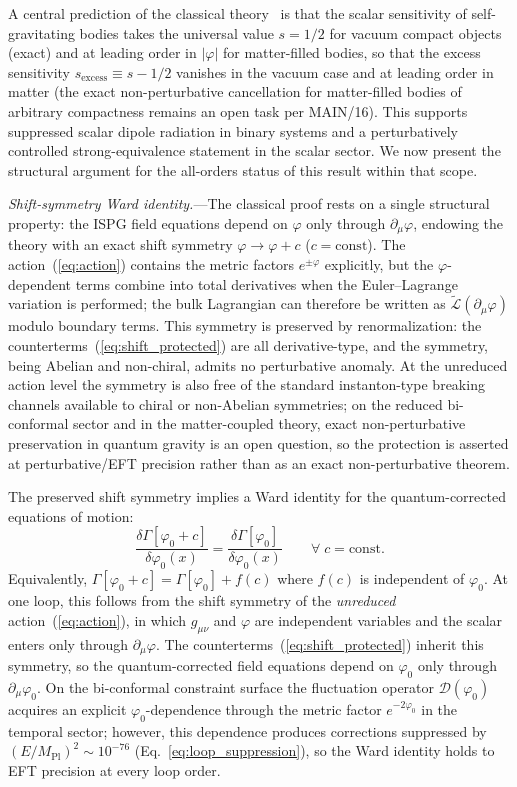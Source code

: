 \documentclass[aps,prd,onecolumn,superscriptaddress,nofootinbib,showpacs,12pt,notitlepage]{revtex4-2}
\newcommand{\Mpl}{M_{\mathrm{Pl}}}
\begin{document}
A central prediction of the classical
theory~\cite{Lotishvili2026} is that the scalar sensitivity
of self-gravitating bodies takes the universal value
$s = 1/2$ for vacuum compact objects (exact) and at leading
order in $|\varphi|$ for matter-filled bodies, so that the
excess sensitivity $s_{\mathrm{excess}} \equiv s - 1/2$
vanishes in the vacuum case and at leading order in matter
(the exact non-perturbative cancellation for matter-filled
bodies of arbitrary compactness remains an open task per
MAIN/16). This supports suppressed scalar dipole radiation
in binary systems and a perturbatively controlled
strong-equivalence statement in the scalar sector.  We
now present the structural argument for the all-orders
status of this result within that scope.

\textit{Shift-symmetry Ward identity.}---The classical
proof rests on a single structural property: the ISPG
field equations depend on $\varphi$ only through
$\partial_\mu\varphi$, endowing the theory with an exact
shift symmetry $\varphi \to \varphi + c$
($c = \mathrm{const}$).  The action~(\ref{eq:action})
contains the metric factors $e^{\pm\varphi}$ explicitly,
but the $\varphi$-dependent terms combine into total
derivatives when the Euler--Lagrange variation is
performed; the bulk Lagrangian can therefore be written as
$\tilde{\mathcal{L}}(\partial_\mu\varphi)$ modulo boundary
terms.  This symmetry is preserved by renormalization: the
counterterms~(\ref{eq:shift_protected}) are all
derivative-type, and the symmetry, being Abelian and
non-chiral, admits no perturbative anomaly.  At the
unreduced action level the symmetry is also free of the
standard instanton-type breaking channels available to chiral
or non-Abelian symmetries; on the reduced bi-conformal
sector and in the matter-coupled theory, exact non-perturbative
preservation in quantum gravity is an open question, so the
protection is asserted at perturbative/EFT precision rather
than as an exact non-perturbative theorem.

The preserved shift symmetry implies a Ward identity for
the quantum-corrected equations of motion:
\begin{equation}\label{eq:ward_shift}
  \frac{\delta\Gamma[\varphi_0 + c]}
       {\delta\varphi_0(x)}
  = \frac{\delta\Gamma[\varphi_0]}
         {\delta\varphi_0(x)}
  \qquad\forall\; c = \mathrm{const}.
\end{equation}
Equivalently, $\Gamma[\varphi_0+c] = \Gamma[\varphi_0] +
f(c)$ where $f(c)$ is independent of $\varphi_0$.
At one loop, this follows from the shift symmetry of the
\emph{unreduced} action~(\ref{eq:action}), in which
$g_{\mu\nu}$ and $\varphi$ are independent variables and
the scalar enters only through $\partial_\mu\varphi$.
The counterterms~(\ref{eq:shift_protected}) inherit this
symmetry, so the quantum-corrected field equations depend
on $\varphi_0$ only through $\partial_\mu\varphi_0$.
On the bi-conformal constraint surface the fluctuation
operator $\mathcal{D}(\varphi_0)$ acquires an explicit
$\varphi_0$-dependence through the metric factor
$e^{-2\varphi_0}$ in the temporal sector; however, this
dependence produces corrections suppressed by
$(E/\Mpl)^{2} \sim 10^{-76}$
(Eq.~\ref{eq:loop_suppression}), so the Ward
identity holds to EFT precision at every loop order.
\end{document}
